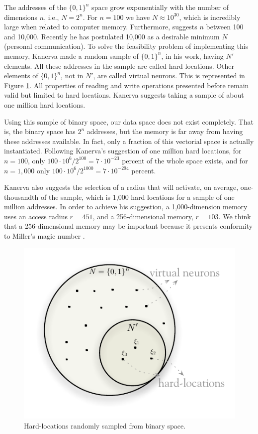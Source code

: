 The addresses of the $\{0,1\}^{n}$ space grow exponentially with the number of dimensions $n$, i.e., $N=2^{n}$. For $n=100$ we have $N\approx10^{30}$, which is incredibly large when related to computer memory. Furthermore, \citet{Kanerva1988} suggests $n$ between 100 and 10,000. Recently he has postulated 10,000 as a desirable minimum $N$ (personal communication). To solve the feasibility problem of implementing this memory, Kanerva made a random sample of $\{0,1\}^{n}$, in his work, having $N'$ elements. All these addresses in the sample are called hard locations. Other elements of $\{0,1\}^{n}$, not in $N'$, are called virtual neurons. This is represented in Figure \ref{fig-hardlocations}.  All properties of reading and write operations presented before remain valid but limited to hard locations. Kanerva suggests taking a sample of about one million hard locations.

Using this sample of binary space, our data space does not exist completely.  That is, the binary space has $2^{n}$ addresses, but the memory is far away from having these addresses available. In fact, only a fraction of this vectorial space is actually instantiated. Following Kanerva's suggestion of one million hard locations, for $n=100$, only $100\cdot10^{6}/2^{100}=7\cdot10^{-23}$ percent of the whole space exists, and for $n=1,000$ only $100\cdot10^{6}/2^{1000}=7\cdot10^{-294}$ percent.

Kanerva also suggests the selection of a radius that will activate, on average, one-thousandth of the sample, which is 1,000 hard locations for a sample of one million addresses. In order to achieve his suggestion, a 1,000-dimension memory uses an access radius $r=451$, and a 256-dimensional memory, $r=103$. We think that a 256-dimensional memory may be important because it presents conformity to Miller's magic number \citep{Linhares2011}.

\begin{figure}[!htb]
\centering\includegraphics[scale=0.75]{./images02/hardlocations.pdf}

\caption{Hard-locations randomly sampled from binary space.\label{fig-hardlocations}}
\end{figure}


